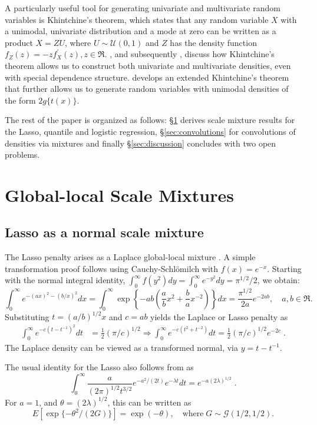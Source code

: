 \documentclass[ECP]{ejpecp} %
\def\CS{Cauchy-Schl\"omilch}
\newcommand{\GammaRV}{\mathcal{G}}
\newcommand{\UnifRV}{\mathcal{U}}
\newcommand{\half}{\frac{1}{2}}
\begin{document}
A particularly useful tool for generating univariate and multivariate random variables is Khintchine's theorem, which states that any random variable $X$ with a unimodal, univariate distribution and a mode at zero can be written as a product $X = Z U$, where $U \sim \UnifRV(0,1)$ and $Z$ has the density function $f_Z(z) = -z f^{\prime}_{X}(z), z \in \Re$. \cite{bryson1982constructing}, and subsequently \cite{jones2012khintchine}, discuss how Khintchine's theorem allows us to construct both univariate and multivariate densities, even with special dependence structure. \cite{jones_generating_2014} develops an extended Khintchine's theorem that further allows us to generate random variables with unimodal densities of the form $2 g\{t(x)\}$. 

The rest of the paper is organized as follows: \S\ref{sec:gls_mixes} derives scale mixture results for the Lasso, quantile and logistic regression, \S\ref{sec:convolutions} for convolutions of densities via mixtures and finally \S\ref{sec:discussion} concludes with two open problems.

\section{Global-local Scale Mixtures}
\label{sec:gls_mixes}
\subsection{Lasso as a normal scale mixture}

The Lasso penalty arises as a Laplace global-local mixture \cite{andrews_scale_1974}.  A simple transformation proof follows using \CS{} with $f(x) = e^{-x}$.  Starting with the normal integral identity, $\int_{0}^{\infty} f(y^2) dy = \int_0^\infty e^{-y^2} dy = \pi^{1/2}/2 $, we obtain:
\[
\int_0^\infty e^{-(a x)^2 - (b/x)^2} d x = \int_0^{\infty}\exp\left\{-a b \left(\frac{a}{b} x^2 + \frac{b}{a} x^{-2} \right)\right\} dx = \frac{\pi^{1/2}}{2a} e^{-2 a b}, \quad a,b \in \Re.
\]
Substituting $t = (a/b)^{1/2} x$ and $c = ab$ yields the Laplace or Lasso penalty as
\begin{align*}
  \int_0^\infty e^{- c (t - t^{-1})^2} dt &= \half (\pi/c)^{1/2} \Rightarrow \int_0^\infty e^{- c (t^2 + t^{-2})} dt  = \half (\pi/c)^{1/2} e^{-2c}\;. 
\end{align*}
The Laplace density can be viewed as a transformed normal, via $y = t - t^{-1}$.

\begin{proposition}
The usual identity for the Lasso also follows from \cite{levy1940certains} as
\begin{equation}
  \int_{0}^{\infty} \frac{a}{(2 \pi)^{1/2} t^{3/2}} e^{-{a^2}/({2 t})} e^{-\lambda t} dt = e^{-a (2 \lambda)^{1/2} } \;.\label{eq:levy}
\end{equation}
For $a = 1$, and $\theta = (2 \lambda)^{1/2}$, this can be written as 
\begin{equation}
  E \left[ \exp\{-\theta^2/(2G)\} \right] = \exp(-\theta),\quad \mbox{where} \; G \sim \GammaRV(1/2, 1/2).
  \label{eq:gamma}
\end{equation}
\end{proposition}
\end{document}
